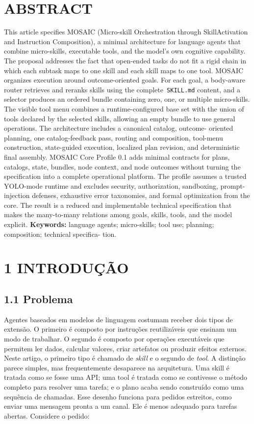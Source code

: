 \documentclass[12pt,a4paper]{article}
\begin{document}

\section*{ABSTRACT}

This article specifies MOSAIC (Micro-skill Orchestration through SkillActivation and Instruction Composition), a minimal architecture for language agents that combine micro-skills, executable tools, and the model’s own cognitive capability. The proposal addresses the fact that open-ended tasks do not fit a rigid chain in which each subtask maps to one skill and each skill maps to one tool. MOSAIC organizes execution around outcome-oriented goals. For each goal, a body-aware router retrieves and reranks skills using the complete\texttt{ SKILL.md} content, and a selector produces an ordered bundle containing zero, one, or multiple micro-skills. The visible tool menu combines a runtime-configured base set with the union of tools declared by the selected skills, allowing an empty bundle to use general operations. The architecture includes a canonical catalog, outcome- oriented planning, one catalog-feedback pass, routing and composition, tool-menu construction, state-guided execution, localized plan revision, and deterministic final assembly. MOSAIC Core Profile 0.1 adds minimal contracts for plans, catalogs, state, bundles, node context, and node outcomes without turning the specification into a complete operational platform. The profile assumes a trusted YOLO-mode runtime and excludes security, authorization, sandboxing, prompt-injection defenses, exhaustive error taxonomies, and formal optimization from the core. The result is a reduced and implementable technical specification that makes the many-to-many relations among goals, skills, tools, and the model explicit. \textbf{Keywords:} language agents; micro-skills; tool use; planning; composition; technical specifica- tion.


\section*{1 INTRODUÇÃO}

\subsection*{1.1 Problema}

Agentes baseados em modelos de linguagem costumam receber dois tipos de extensão. O primeiro é composto por instruções reutilizáveis que ensinam um modo de trabalhar. O segundo é composto por operações executáveis que permitem ler dados, calcular valores, criar artefatos ou produzir efeitos externos. Neste artigo, o primeiro tipo é chamado de\textit{ skill} e o segundo de\textit{ tool}. A distinção parece simples, mas frequentemente desaparece na arquitetura. Uma skill é tratada como se fosse uma API; uma tool é tratada como se contivesse o método completo para resolver uma tarefa; e o plano acaba sendo construído como uma sequência de chamadas. Esse desenho funciona para pedidos estreitos, como enviar uma mensagem pronta a um canal. Ele é menos adequado para tarefas abertas. Considere o pedido:
\end{document}
